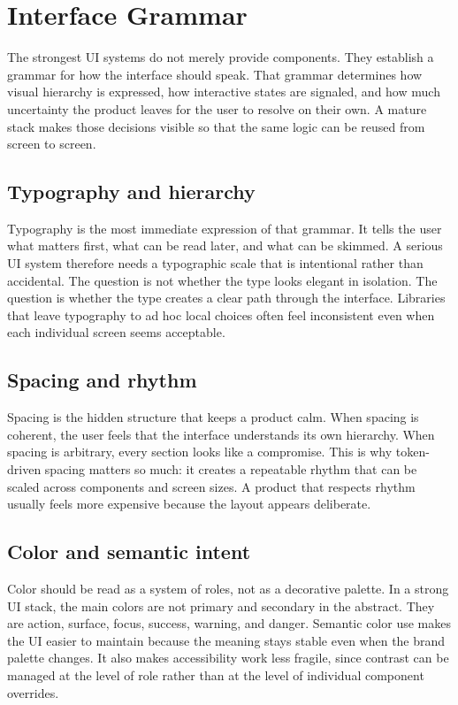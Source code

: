 \documentclass[11pt,twoside,a4paper]{article}
\begin{document}
\section{Interface Grammar}
The strongest UI systems do not merely provide components. They establish a grammar for how the interface should speak. That grammar determines how visual hierarchy is expressed, how interactive states are signaled, and how much uncertainty the product leaves for the user to resolve on their own. A mature stack makes those decisions visible so that the same logic can be reused from screen to screen.

\subsection{Typography and hierarchy}
Typography is the most immediate expression of that grammar. It tells the user what matters first, what can be read later, and what can be skimmed. A serious UI system therefore needs a typographic scale that is intentional rather than accidental. The question is not whether the type looks elegant in isolation. The question is whether the type creates a clear path through the interface. Libraries that leave typography to ad hoc local choices often feel inconsistent even when each individual screen seems acceptable.

\subsection{Spacing and rhythm}
Spacing is the hidden structure that keeps a product calm. When spacing is coherent, the user feels that the interface understands its own hierarchy. When spacing is arbitrary, every section looks like a compromise. This is why token-driven spacing matters so much: it creates a repeatable rhythm that can be scaled across components and screen sizes. A product that respects rhythm usually feels more expensive because the layout appears deliberate.

\subsection{Color and semantic intent}
Color should be read as a system of roles, not as a decorative palette. In a strong UI stack, the main colors are not primary and secondary in the abstract. They are action, surface, focus, success, warning, and danger. Semantic color use makes the UI easier to maintain because the meaning stays stable even when the brand palette changes. It also makes accessibility work less fragile, since contrast can be managed at the level of role rather than at the level of individual component overrides.
\end{document}
